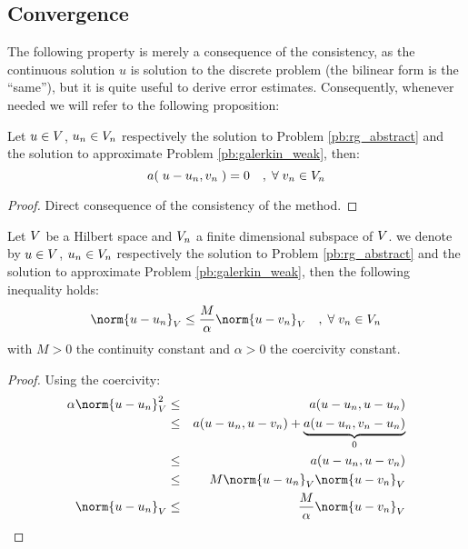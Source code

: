 \subsection{Convergence}

The following property is merely a consequence of the consistency, as the continuous solution $u$ is solution to the discrete problem (\ie the bilinear form is the ``same''), but it is quite useful to derive error estimates.
Consequently, whenever needed we will refer to the following proposition:
\begin{prpstn}
 Let $u \in {V}$, $u_n \in {V}_n$ respectively the solution to Problem \eqref{pb:rg_abstract} and the solution to approximate Problem \eqref{pb:galerkin_weak}, then:
\begin{equation*}
a(\;u - u_n, v_n\;) = 0\quad,\;{\forall\;} v_n \in {V}_n
\end{equation*}
\end{prpstn}
\begin{proof}
Direct consequence of the consistency of the method.
\end{proof}

\begin{lmm}[Consistency]
Let ${V}$ be a Hilbert space and ${V}_n$ a finite dimensional subspace of ${V}$.
we denote by $u \in {V}$, $u_n \in {V}_n$ respectively the solution to Problem \eqref{pb:rg_abstract} and the solution to approximate Problem \eqref{pb:galerkin_weak}, then the following inequality holds:
\begin{equation*}
\norm{u - u_n}_\xV  \leq \dfrac{M}{\alpha} \norm{u - v_n}_\xV\quad,\; \forany v_n \in \xV_n
\end{equation*}
with $M > 0$ the continuity constant and $\alpha > 0$ the coercivity constant.
\end{lmm}
\begin{proof}
Using the coercivity:
\begin{eqnarray*}
\alpha \norm{u - u_n}_\xV^2 &\leq& a(u - u_n, u - u_n)\\
 &\leq& a(u - u_n, u - v_n) + \underbrace{a(u - u_n, v_n - u_n)}_{0}\\
 &\leq& a(u - u_n, u - v_n)\\
 &\leq& M \norm{u - u_n}_\xV \norm{u - v_n}_\xV\\
\norm{u - u_n}_\xV &\leq& \dfrac{M}{\alpha} \norm{u - v_n}_\xV\\
\end{eqnarray*}
\end{proof}

